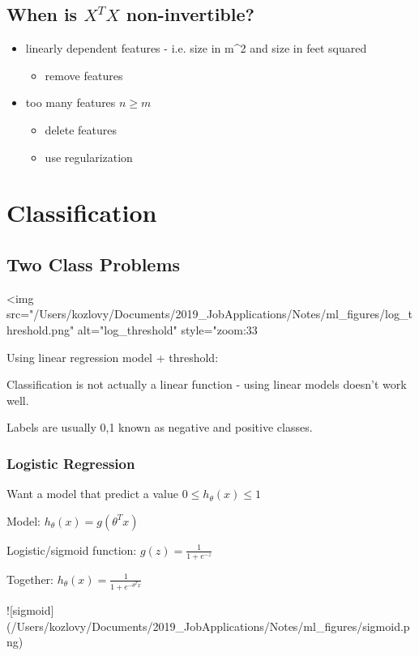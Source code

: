 {{{\subsection{When is $X^TX$ non-invertible?}

\begin{itemize}
\item linearly dependent features - i.e. size in m^2 and size in feet squared
\begin{itemize}
\item remove features
\end{itemize}
\item too many features $n\ge m$ 
\begin{itemize}
  \item delete features 
  \item use regularization
\end{itemize}
\end{itemize}

\section{Classification}

\subsection{Two Class Problems}

<img src="/Users/kozlovy/Documents/2019_JobApplications/Notes/ml_figures/log_threshold.png" alt="log_threshold" style="zoom:33%

Using linear regression model + threshold:

Classification is not actually a linear function - using linear models doesn't work well.

Labels are usually {0,1} known as negative and positive classes.

\subsubsection{Logistic Regression}

Want a model that predict a value $0\le h_\theta(x)\le 1$

Model: $h_\theta(x)=g(\theta^T x)$ 

Logistic/sigmoid function: $g(z) = \frac{1}{1+e^{-z}}$

Together: $h_\theta(x)=\frac{1}{1+e^{-\theta^T x}}$

![sigmoid](/Users/kozlovy/Documents/2019_JobApplications/Notes/ml_figures/sigmoid.png)

}}}

